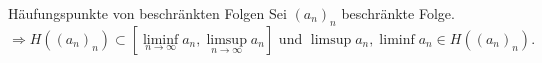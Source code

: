 \documentclass[main.tex]{subfiles}
\begin{document}
\begin{karte}{Häufungspunkte von beschränkten Folgen}
    Sei \({(a_n)}_n\) beschränkte Folge.
    \[ \Rightarrow H({(a_n)}_n) \subset 
    [ \liminf\limits_{n\rightarrow\infty}a_n, 
    \limsup\limits_{n\rightarrow\infty}a_n ] 
    \text{ und } \limsup a_n, \liminf a_n \in 
    H({(a_n)}_n). \]
\end{karte}
\end{document}
